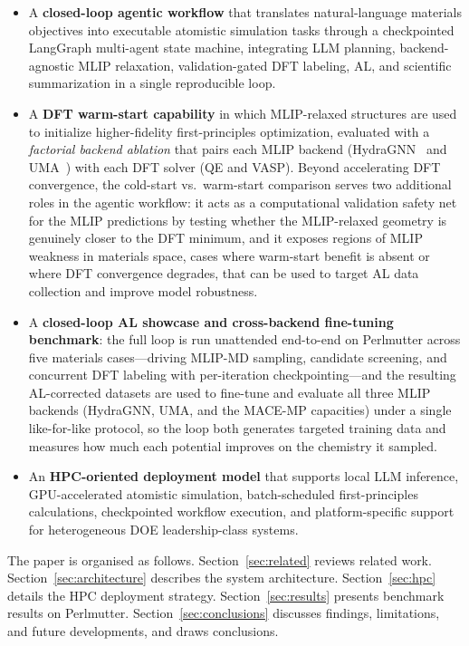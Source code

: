 \documentclass[conference]{IEEEtran}
\def\ac#1{#1}%
\def\acs#1{#1}%
\begin{document}
\begin{itemize}
\item A \textbf{closed-loop agentic workflow} that translates natural-language
  materials objectives into executable atomistic simulation tasks through a
  checkpointed LangGraph multi-agent state machine, integrating \ac{LLM} planning,
  backend-agnostic \acs{MLIP} relaxation, validation-gated \acs{DFT} labeling,
  \acs{AL}, and scientific summarization in a single reproducible loop.
\item A \textbf{\acs{DFT} warm-start capability} in which \acs{MLIP}-relaxed structures are
  used to initialize higher-fidelity first-principles optimization, evaluated
  with a \emph{factorial backend ablation} that pairs each \acs{MLIP} backend
  (HydraGNN~\cite{hydragnn} and UMA~\cite{wood2025uma}) with each \acs{DFT}
  solver (\acs{QE} and \acs{VASP}). Beyond
  accelerating \acs{DFT} convergence, the cold-start vs.\ warm-start comparison serves
  two additional roles in the agentic workflow: it acts as a computational
  validation safety net for the \acs{MLIP} predictions by testing whether the
  \acs{MLIP}-relaxed geometry is genuinely closer to the \acs{DFT} minimum, and it
  exposes regions of \acs{MLIP} weakness in materials space, cases where warm-start
  benefit is absent or where \acs{DFT} convergence degrades, that can be used to
  target \acs{AL} data collection and improve model robustness.
\item A \textbf{closed-loop \acs{AL} showcase and cross-backend
  fine-tuning benchmark}: the full loop is run unattended end-to-end on
  Perlmutter across five materials cases---driving \acs{MLIP}-\acs{MD} sampling,
  candidate screening, and concurrent \acs{DFT} labeling with
  per-iteration checkpointing---and the resulting \acs{AL}-corrected
  datasets are used to fine-tune and evaluate all three \acs{MLIP} backends
  (HydraGNN, UMA, and the MACE-MP capacities) under a single like-for-like
  protocol, so the loop both generates targeted training data and measures how
  much each potential improves on the chemistry it sampled.
\item An \textbf{\acs{HPC}-oriented deployment model} that supports local \acs{LLM}
  inference, \acs{GPU}-accelerated atomistic simulation, batch-scheduled
  first-principles calculations, checkpointed workflow execution, and
  platform-specific support for heterogeneous \ac{DOE} leadership-class systems.
\end{itemize}

The paper is organised as follows. Section~\ref{sec:related} reviews related
work. Section~\ref{sec:architecture} describes the system architecture.
Section~\ref{sec:hpc} details the \acs{HPC} deployment strategy.
Section~\ref{sec:results} presents benchmark results on Perlmutter.
Section~\ref{sec:conclusions} discusses findings, limitations, and future
developments, and draws conclusions.
\end{document}

